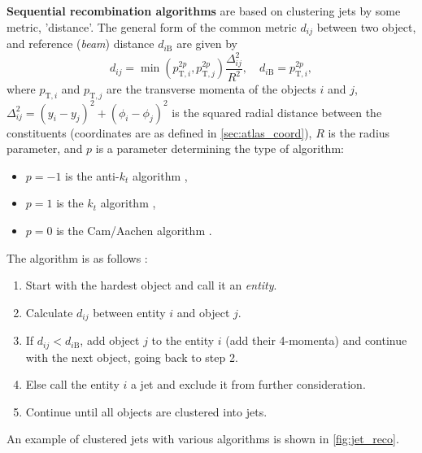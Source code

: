 \textbf{Sequential recombination algorithms} are based on clustering jets by some metric, 'distance'.
The general form of the common metric $d_{ij}$ between two object, and reference (\emph{beam}) distance $d_{i\text{B}}$ are given by \cite{antikt}
\begin{equation}
    \label{eq:kt_distance}
    d_{ij} = \min{(p_{\text{T}, i}^{2p}, p_{\text{T}, j}^{2p})} \frac{\Delta^2_{ij}}{R^2}, \quad d_{i\text{B}} = p_{\text{T}, i}^{2p},
\end{equation}
where $p_{\text{T}, i}$ and $p_{\text{T}, j}$ are the transverse momenta of the objects $i$ and $j$, $\Delta^2_{ij} = (y_i - y_j)^2 + (\phi_i - \phi_j)^2$ is the squared radial distance between the constituents (coordinates are as defined in \cref{sec:atlas_coord}), $R$ is the radius parameter, and $p$ is a parameter determining the type of algorithm:
\begin{itemize}
    \item $p=-1$ is the anti-$k_t$ \footnotemark algorithm \cite{antikt},
    \item $p=1$ is the $k_t$ \footnotemark algorithm \cite{kt},
    \item $p=0$ is the Cam/Aachen algorithm \cite{Cam_Aachen_alg}.
\end{itemize}
The algorithm is as follows \cite{antikt}:
\begin{enumerate}
    \item Start with the hardest object and call it an \emph{entity}.
    \item Calculate $d_{ij}$ between entity $i$ and object $j$.
    \item If $d_{ij} < d_{i\text{B}}$, add object $j$ to the entity $i$ (add their 4-momenta) and continue with the next object, going back to step 2.
    \item Else call the entity $i$ a jet and exclude it from further consideration.
    \item Continue until all objects are clustered into jets.
\end{enumerate}
An example of clustered jets with various algorithms is shown in \cref{fig:jet_reco}.

